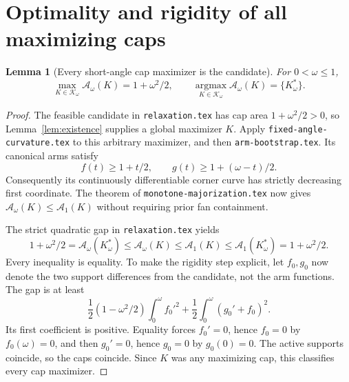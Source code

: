 \documentclass[11pt]{article}
\newtheorem{lemma}[theorem]{Lemma}
\begin{document}
\section{Optimality and rigidity of all maximizing caps}
\begin{lemma}[Every short-angle cap maximizer is the candidate]\label{lem:cap}
For $0<\omega\le1$,
\[
 \max_{K\in\mathcal K_\omega}\mathcal A_\omega(K)=1+\omega^2/2,
 \qquad \operatorname*{argmax}_{K\in\mathcal K_\omega}\mathcal A_\omega(K)=\{K_\omega^*\}.
\]
\end{lemma}
\begin{proof}
The feasible candidate in \texttt{relaxation.tex} has cap area $1+\omega^2/2>0$, so Lemma~\ref{lem:existence} supplies a global maximizer $K$. Apply \texttt{fixed-angle-curvature.tex} to this arbitrary maximizer, and then \texttt{arm-bootstrap.tex}. Its canonical arms satisfy
\[
 f(t)\ge1+t/2,\qquad g(t)\ge1+(\omega-t)/2.
\]
Consequently its continuously differentiable corner curve has strictly decreasing first coordinate. The theorem of \texttt{monotone-majorization.tex} now gives $\mathcal A_\omega(K)\le\mathcal A_1(K)$ without requiring prior fan containment.

The strict quadratic gap in \texttt{relaxation.tex} yields
\[
 1+\omega^2/2=\mathcal A_\omega(K_\omega^*)
 \le\mathcal A_\omega(K)\le\mathcal A_1(K)
 \le\mathcal A_1(K_\omega^*)=1+\omega^2/2.
\]
Every inequality is equality. To make the rigidity step explicit, let $f_0,g_0$ now denote the two support differences from the candidate, not the arm functions. The gap is at least
\[
 \frac12(1-\omega^2/2)\int_0^\omega f_0'^2
 +\frac12\int_0^\omega(g_0'+f_0)^2.
\]
Its first coefficient is positive. Equality forces $f_0'=0$, hence $f_0=0$ by $f_0(\omega)=0$, and then $g_0'=0$, hence $g_0=0$ by $g_0(0)=0$. The active supports coincide, so the caps coincide. Since $K$ was any maximizing cap, this classifies every cap maximizer.
\end{proof}
\end{document}
